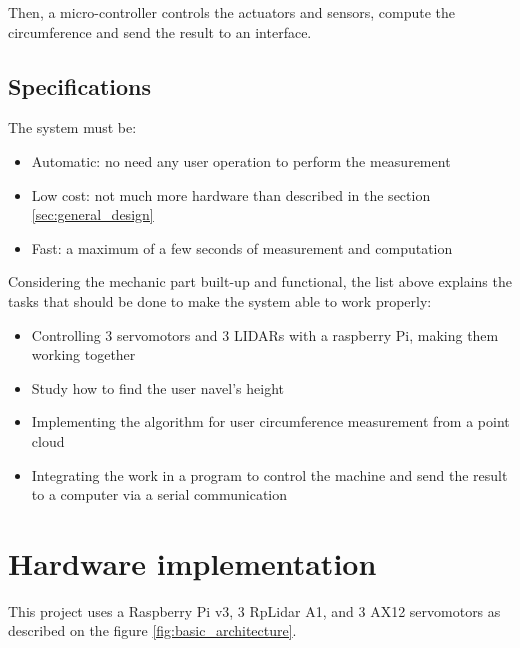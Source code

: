 \documentclass{article}
\newcommand{\vsp}{\vspace{\baselineskip}}
\begin{document}
\vsp

Then, a micro-controller controls the actuators and sensors, compute the circumference and send the result to an interface. 

\subsection{Specifications}

The system must be:
\begin{itemize}
    \item Automatic: no need any user operation to perform the measurement
    \item Low cost: not much more hardware than described in the section \ref{sec:general_design}
    \item Fast: a maximum of a few seconds of measurement and computation
\end{itemize}

\vsp

Considering the mechanic part built-up and functional, the list above explains the tasks that should be done to make the system able to work properly: 
\begin{itemize}
    \item Controlling 3 servomotors and 3 LIDARs with a raspberry Pi, making them working together
    \item Study how to find the user navel's height
    \item Implementing the algorithm for user circumference measurement from a point cloud
    \item Integrating the work in a program to control the machine and send the result to a computer via a serial communication
\end{itemize}

\section{Hardware implementation}

This project uses a Raspberry Pi v3, 3 RpLidar A1, and 3 AX12 servomotors as described on the figure \ref{fig:basic_architecture}.
\end{document}
